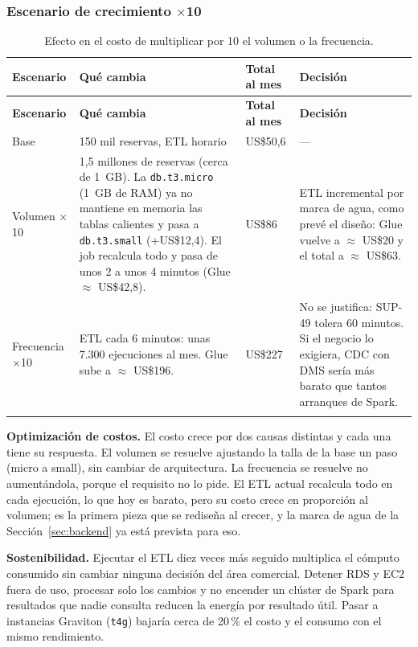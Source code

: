 \subsubsection{Escenario de crecimiento $\times$10}
\begin{longtable}{@{}L{3.2cm} L{6.4cm} R{2.6cm} L{3.4cm}@{}}
\toprule \textbf{Escenario} & \textbf{Qué cambia} & \textbf{Total al mes} & \textbf{Decisión} \\ \midrule \endfirsthead
\toprule \textbf{Escenario} & \textbf{Qué cambia} & \textbf{Total al mes} & \textbf{Decisión} \\ \midrule \endhead
Base & 150 mil reservas, ETL horario & US\$50,6 & --- \\
Volumen $\times$10 & 1,5 millones de reservas (cerca de 1~GB). La \texttt{db.t3.micro} (1~GB de RAM) ya no mantiene en memoria las tablas calientes y pasa a \texttt{db.t3.small} (+US\$12,4). El job recalcula todo y pasa de unos 2 a unos 4 minutos (Glue $\approx$ US\$42,8). & US\$86 & ETL incremental por marca de agua, como prevé el diseño: Glue vuelve a $\approx$ US\$20 y el total a $\approx$ US\$63. \\
Frecuencia $\times$10 & ETL cada 6 minutos: unas 7.300 ejecuciones al mes. Glue sube a $\approx$ US\$196. & US\$227 & No se justifica: SUP-49 tolera 60 minutos. Si el negocio lo exigiera, CDC con DMS sería más barato que tantos arranques de Spark. \\
\bottomrule
\caption{Efecto en el costo de multiplicar por 10 el volumen o la frecuencia.}
\end{longtable}

\textbf{Optimización de costos.} El costo crece por dos causas distintas y cada una tiene su respuesta. El volumen se resuelve ajustando la talla de la base un paso (micro a small), sin cambiar de arquitectura. La frecuencia se resuelve no aumentándola, porque el requisito no lo pide. El ETL actual recalcula todo en cada ejecución, lo que hoy es barato, pero su costo crece en proporción al volumen; es la primera pieza que se rediseña al crecer, y la marca de agua de la Sección~\ref{sec:backend} ya está prevista para eso.

\textbf{Sostenibilidad.} Ejecutar el ETL diez veces más seguido multiplica el cómputo consumido sin cambiar ninguna decisión del área comercial. Detener RDS y EC2 fuera de uso, procesar solo los cambios y no encender un clúster de Spark para resultados que nadie consulta reducen la energía por resultado útil. Pasar a instancias Graviton (\texttt{t4g}) bajaría cerca de 20\,\% el costo y el consumo con el mismo rendimiento.
